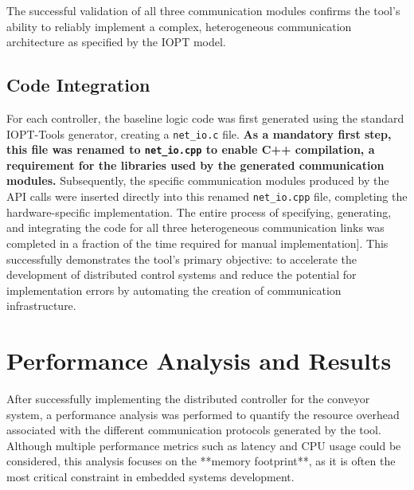 The successful validation of all three communication modules confirms the tool's ability to reliably implement a complex, heterogeneous communication architecture as specified by the IOPT model.


\subsection{Code Integration}
\label{subsec:code_integration}

For each controller, the baseline logic code was first generated using the standard IOPT-Tools generator, creating a \texttt{net\_io.c} file. \textbf{As a mandatory first step, this file was renamed to \texttt{net\_io.cpp} to enable C++ compilation, a requirement for the libraries used by the generated communication modules.} Subsequently, the specific communication modules produced by the API calls were inserted directly into this renamed \texttt{net\_io.cpp} file, completing the hardware-specific implementation. The entire process of specifying, generating, and integrating the code for all three heterogeneous communication links was completed in a fraction of the time required for manual implementation]. This successfully demonstrates the tool's primary objective: to accelerate the development of distributed control systems and reduce the potential for implementation errors by automating the creation of communication infrastructure.

\section{Performance Analysis and Results}
\label{sec:performance_analysis}

After successfully implementing the distributed controller for the conveyor system, a performance analysis was performed to quantify the resource overhead associated with the different communication protocols generated by the tool. Although multiple performance metrics such as latency and CPU usage could be considered, this analysis focuses on the **memory footprint**, as it is often the most critical constraint in embedded systems development.

